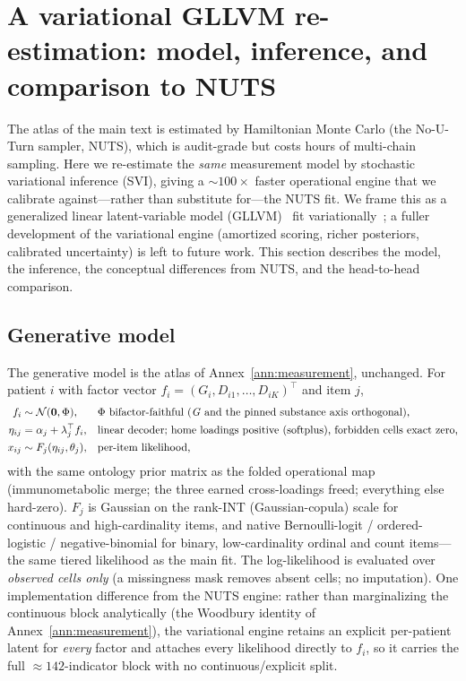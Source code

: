 \section{A variational GLLVM re-estimation: model, inference, and comparison to NUTS}
\label{ann:variational}

The atlas of the main text is estimated by Hamiltonian Monte Carlo (the No-U-Turn sampler,
NUTS), which is audit-grade but costs hours of multi-chain sampling. Here we re-estimate the
\emph{same} measurement model by stochastic variational inference (SVI), giving a
${\sim}100\times$ faster operational engine that we calibrate against---rather than substitute
for---the NUTS fit. We frame this as a generalized linear latent-variable model
(GLLVM)~\citep{hui2017gllvm} fit variationally~\citep{blei2017vi,hoffman2013svi}; a fuller
development of the variational engine (amortized scoring, richer posteriors, calibrated
uncertainty) is left to future work. This section describes the model, the inference, the
conceptual differences from NUTS, and the head-to-head comparison.

\subsection{Generative model}

The generative model is the atlas of Annex~\ref{ann:measurement}, unchanged. For patient $i$
with factor vector $f_i=(G_i,D_{i1},\dots,D_{iK})^{\top}$ and item $j$,
\begin{align}
  f_i &\sim \mathcal N(\mathbf 0,\Phi), &&\Phi\ \text{bifactor-faithful (\Gfac{} and the pinned substance axis orthogonal),} \label{eqH:prior}\\
  \eta_{ij} &= \alpha_j + \lambda_j^{\top} f_i, &&\text{linear decoder; home loadings positive (softplus), forbidden cells exact zero,}\label{eqH:decoder}\\
  x_{ij} &\sim F_j(\eta_{ij},\theta_j), &&\text{per-item likelihood,}\label{eqH:lik}
\end{align}
with the same ontology prior matrix as the folded operational map (immunometabolic merge; the
three earned cross-loadings freed; everything else hard-zero). $F_j$ is Gaussian on the
rank-INT (Gaussian-copula) scale for continuous and high-cardinality items, and native
Bernoulli-logit / ordered-logistic / negative-binomial for binary, low-cardinality ordinal and
count items---the same tiered likelihood as the main fit. The log-likelihood is evaluated over
\emph{observed cells only} (a missingness mask removes absent cells; no imputation). One
implementation difference from the NUTS engine: rather than marginalizing the continuous block
analytically (the Woodbury identity of Annex~\ref{ann:measurement}), the variational engine
retains an explicit per-patient latent for \emph{every} factor and attaches every likelihood
directly to $f_i$, so it carries the full $\approx142$-indicator block with no
continuous/explicit split.

